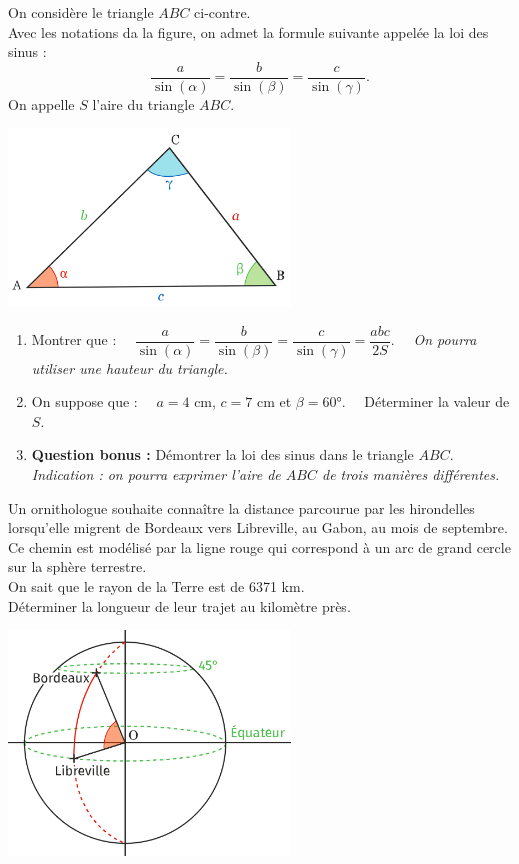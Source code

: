 \documentclass[a4paper,11pt,exos]{nsi} %
\begin{document}
\exo{}
\begin{minipage}{9.5cm}
	
	On considère le triangle $ABC$ ci-contre.\\
	Avec les notations da la figure, on admet la formule suivante appelée la loi des sinus :
	$$\dfrac{a}{\sin(\alpha)}=\dfrac{b}{\sin(\beta)}=\dfrac{c}{\sin(\gamma)}.$$
	On appelle $S$ l'aire du triangle $ABC$.
\end{minipage}
\begin{minipage}{7.5cm}
	\flushright \includegraphics[width=7.5cm]{triangle}
\end{minipage}
\begin{enumerate}
	\item 	Montrer que : $\quad \dfrac{a}{\sin(\alpha)}=\dfrac{b}{\sin(\beta)}=\dfrac{c}{\sin(\gamma)}=\dfrac{abc}{2S}.\quad$
	\textit{On pourra utiliser une hauteur du triangle.}
	\item 	On suppose que : $\quad a=4$ cm, $c=7$ cm et $\beta=60°.\quad$	Déterminer la valeur de $S$.	
	\item	\textbf{Question bonus :} Démontrer la loi des sinus dans le triangle $ABC$.\\
	\textit{Indication : on pourra exprimer l'aire de $ABC$ de trois manières différentes.} 
\end{enumerate}


\begin{minipage}{9cm}
	\exo{}
	Un ornithologue souhaite connaître la distance parcourue par les hirondelles lorsqu'elle migrent de Bordeaux vers Libreville, au Gabon, au mois de septembre.\\
	Ce chemin est modélisé par la ligne rouge qui correspond à un arc de grand cercle sur la sphère terrestre.\\
	On sait que le rayon de la Terre est de 6371 km.\\[.5em]
	Déterminer la longueur de leur trajet au kilomètre près.
\end{minipage}
\begin{minipage}{8cm}
	\flushright \includegraphics[width=7.5cm]{sphere}
\end{minipage}
\end{document}
